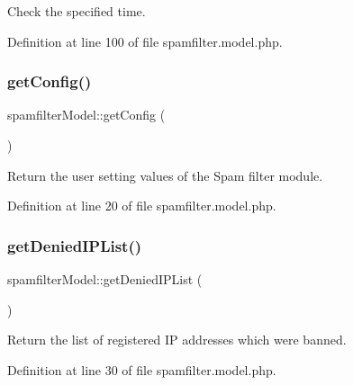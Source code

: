Check the specified time. 



Definition at line 100 of file spamfilter.\+model.\+php.

\mbox{\label{classspamfilterModel_a695fa33af1081275d523cb9366645e85}} 
\subsubsection{\texorpdfstring{get\+Config()}{getConfig()}}
{\footnotesize\ttfamily spamfilter\+Model\+::get\+Config (\begin{DoxyParamCaption}{ }\end{DoxyParamCaption})}



Return the user setting values of the Spam filter module. 



Definition at line 20 of file spamfilter.\+model.\+php.

\mbox{\label{classspamfilterModel_a117cc4509f6046a16e90f8a03e55ed3a}} 
\subsubsection{\texorpdfstring{get\+Denied\+I\+P\+List()}{getDeniedIPList()}}
{\footnotesize\ttfamily spamfilter\+Model\+::get\+Denied\+I\+P\+List (\begin{DoxyParamCaption}{ }\end{DoxyParamCaption})}



Return the list of registered IP addresses which were banned. 



Definition at line 30 of file spamfilter.\+model.\+php.

\mbox{\label{classspamfilterModel_a9fba3707067716e5668f6de7bf54f8f7}} 
